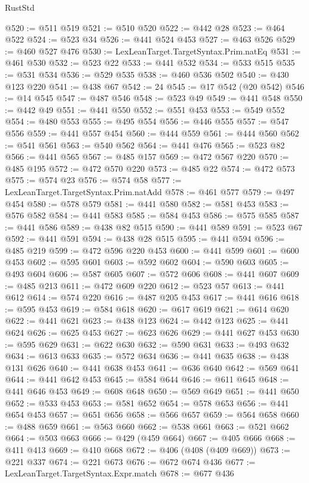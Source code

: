 \begin{lexlean}{RustStd}
\begin{coremodule}
{\begin{coremodule}
{{{{{{{{{{{{{{{{{{{{{{{{{{@520 := @511 @519
@521 := @510 @520
@522 := @442 @28
@523 := @464 @522
@524 := @523 @34
@526 := @441 @524 @453
@527 := @463 @526
@529 := @460 @527 @476
@530 := LexLeanTarget.TargetSyntax.Prim.natEq
@531 := @461 @530
@532 := @523 @22
@533 := @441 @532
@534 := @533 @515
@535 := @531 @534
@536 := @529 @535
@538 := @460 @536 @502
@540 := @430 @123 @220
@541 := @438 @67
@542 := 24
@545 := @17 @542 (@20 @542)
@546 := @14 @545
@547 := @487 @546
@548 := @523 @49
@549 := @441 @548
@550 := @442 @49
@551 := @441 @550
@552 := @551 @453
@553 := @549 @552
@554 := @480 @553
@555 := @495 @554
@556 := @446 @555
@557 := @547 @556
@559 := @441 @557 @454
@560 := @444 @559
@561 := @444 @560
@562 := @541 @561
@563 := @540 @562
@564 := @441 @476
@565 := @523 @82
@566 := @441 @565
@567 := @485 @157
@569 := @472 @567 @220
@570 := @485 @195
@572 := @472 @570 @220
@573 := @485 @22
@574 := @472 @573
@575 := @574 @23
@576 := @574 @58
@577 := LexLeanTarget.TargetSyntax.Prim.natAdd
@578 := @461 @577
@579 := @497 @454
@580 := @578 @579
@581 := @441 @580
@582 := @581 @453
@583 := @576 @582
@584 := @441 @583
@585 := @584 @453
@586 := @575 @585
@587 := @441 @586
@589 := @438 @82 @515
@590 := @441 @589
@591 := @523 @67
@592 := @441 @591
@594 := @438 @28 @515
@595 := @441 @594
@596 := @485 @219
@599 := @472 @596 @220 @453
@600 := @441 @599
@601 := @600 @453
@602 := @595 @601
@603 := @592 @602
@604 := @590 @603
@605 := @493 @604
@606 := @587 @605
@607 := @572 @606
@608 := @441 @607
@609 := @485 @213
@611 := @472 @609 @220
@612 := @523 @57
@613 := @441 @612
@614 := @574 @220
@616 := @487 @205 @453
@617 := @441 @616
@618 := @595 @453
@619 := @584 @618
@620 := @617 @619
@621 := @614 @620
@622 := @441 @621
@623 := @438 @123
@624 := @442 @123
@625 := @441 @624
@626 := @625 @453
@627 := @623 @626
@629 := @441 @627 @453
@630 := @595 @629
@631 := @622 @630
@632 := @590 @631
@633 := @493 @632
@634 := @613 @633
@635 := @572 @634
@636 := @441 @635
@638 := @438 @131 @626
@640 := @441 @638 @453
@641 := @636 @640
@642 := @569 @641
@644 := @441 @642 @453
@645 := @584 @644
@646 := @611 @645
@648 := @441 @646 @453
@649 := @608 @648
@650 := @569 @649
@651 := @441 @650
@652 := @533 @453
@653 := @581 @652
@654 := @578 @653
@656 := @441 @654 @453
@657 := @651 @656
@658 := @566 @657
@659 := @564 @658
@660 := @488 @659
@661 := @563 @660
@662 := @538 @661
@663 := @521 @662
@664 := @503 @663
@666 := @429 (@459 @664)
@667 := @405 @666
@668 := @411 @413
@669 := @410 @668
@672 := @406 (@408 (@409 @669))
@673 := @221 @337
@674 := @221 @673
@676 := @672 @674 @436
@677 := LexLeanTarget.TargetSyntax.Expr.match
@678 := @677 @436
}}}}}}}}}}}}}}}}}}}}}}}}}}
\end{coremodule}}
\end{coremodule}
\end{lexlean}
